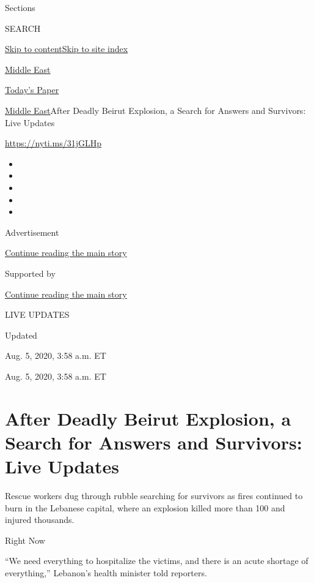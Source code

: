 Sections

SEARCH

\protect\hyperlink{site-content}{Skip to
content}\protect\hyperlink{site-index}{Skip to site index}

\href{https://www.nytimes.com/section/world/middleeast}{Middle East}

\href{https://myaccount.nytimes.com/auth/login?response_type=cookie\&client_id=vi}{}

\href{https://www.nytimes.com/section/todayspaper}{Today's Paper}

\href{/section/world/middleeast}{Middle East}\textbar{}After Deadly
Beirut Explosion, a Search for Answers and Survivors: Live Updates

\url{https://nyti.ms/31jGLHp}

\begin{itemize}
\item
\item
\item
\item
\item
\end{itemize}

Advertisement

\protect\hyperlink{after-top}{Continue reading the main story}

Supported by

\protect\hyperlink{after-sponsor}{Continue reading the main story}

LIVE UPDATES

Updated~

Aug. 5, 2020, 3:58 a.m. ET

Aug. 5, 2020, 3:58 a.m. ET

\hypertarget{after-deadly-beirut-explosion-a-search-for-answers-and-survivors-live-updates}{%
\section{After Deadly Beirut Explosion, a Search for Answers and
Survivors: Live
Updates}\label{after-deadly-beirut-explosion-a-search-for-answers-and-survivors-live-updates}}

Rescue workers dug through rubble searching for survivors as fires
continued to burn in the Lebanese capital, where an explosion killed
more than 100 and injured thousands.

Right Now

``We need everything to hospitalize the victims, and there is an acute
shortage of everything,'' Lebanon's health minister told reporters.

